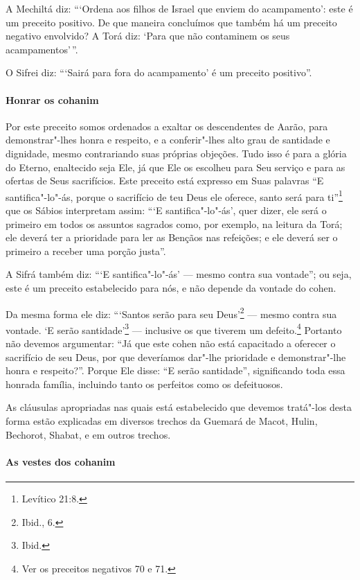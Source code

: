 \begin{multicols}{2}
A Mechiltá\starr{} diz: ```Ordena aos filhos de Israel que enviem do
acampamento': este é um preceito positivo. De que maneira concluímos que
também há um preceito negativo envolvido? A Torá\starr{} diz: `Para que não
contaminem os seus acampamentos'\,''.

O Sifrei\starr{} diz: ```Sairá para fora do acampamento' é um preceito positivo''.

\paragraph{Honrar os cohanim\starr{}}

Por este preceito somos ordenados a exaltar os descendentes de Aarão,
para demonstrar"-lhes honra e respeito, e a conferir"-lhes alto grau de
santidade e dignidade, mesmo contrariando suas próprias objeções. Tudo
isso é para a glória do Eterno, enaltecido seja Ele, já que Ele os
escolheu para Seu serviço e para as ofertas de Seus sacrifícios. Este
preceito está expresso em Suas palavras ``E santifica"-lo"-ás, porque o
sacrifício de teu Deus ele oferece, santo será para ti''\footnote{Levítico 21:8.}
que os Sábios interpretam assim: ```E santifica"-lo"-ás', quer dizer, ele
será o primeiro em todos os assuntos sagrados como, por exemplo, na
leitura da Torá\starr; ele deverá ter a prioridade para ler as Bençãos nas
refeições; e ele deverá ser o primeiro a receber uma porção justa''.

A Sifrá\starr{} também diz: ```E santifica"-lo"-ás' --- mesmo contra sua
vontade''; ou seja, este é um preceito estabelecido para nós, e não
depende da vontade do cohen\starr.

Da mesma forma ele diz: ```Santos serão para seu Deus'\footnote{Ibid., 6.} ---
mesmo contra sua vontade. `E serão santidade'\footnote{Ibid.} --- inclusive os
que tiverem um defeito.\footnote{Ver os preceitos negativos 70 e 71.} Portanto não devemos argumentar:
``Já que este cohen\starr{} não está capacitado a oferecer o sacrifício de seu Deus, por que deveríamos dar"-lhe prioridade e demonstrar"-lhe honra e respeito?''. Porque Ele
disse: ``E serão santidade'', significando toda essa honrada família, incluindo tanto os
perfeitos como os defeituosos.

As cláusulas apropriadas nas quais está estabelecido que devemos
tratá"-los desta forma estão explicadas em diversos trechos da Guemará\starr{} de
Macot\starr, Hulin\starr, Bechorot\starr, Shabat, e em outros trechos.

\paragraph{As vestes dos cohanim\starr{}}



\end{multicols}
